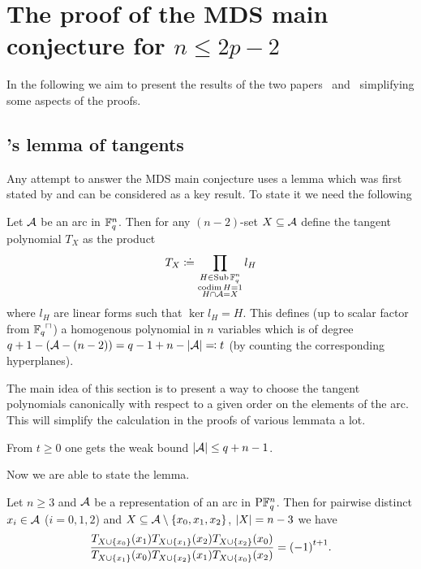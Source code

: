 \section{The proof of the MDS main conjecture for $n\leq 2p-2$}\label{sec-msd-nleq2p-2}

In the following we aim to present the results of the two papers~\cite{ball2011mdsmainconjI} and~\cite{ball2012mdsmainconjII} simplifying some aspects of the proofs.

\subsection{'s lemma of tangents}%

Any attempt to answer the MDS main conjecture uses a lemma which was first stated by  and can be considered as a key result. To state it we need the following

\begin{definition}
    Let $\mathcal{A}$ be an arc in $\mathbb{F}_{q}^n$. Then for any $(n-2)$-set $X\subseteq \mathcal{A}$ define the tangent polynomial $T_X$ as the product
    $$
    T_X\mathrel{\mathrel{\mathop:}\mkern-1.2mu\doteq}\prod_{\substack{H\in\mathop{\mathrm{Sub}}\nolimits \mathbb{F}_{q}^n\\ \mathop\mathrm{codim}{H}=1\\ H\cap\mathcal{A}=X}}{l_H}
    $$
    where $l_H$ are linear forms such that $\ker{l_H}=H$. This defines (up to scalar factor from $\units{\field{q}}$) a homogenous polynomial in $n$ variables which is of degree $q+1-(\mathcal{A}-(n-2))=q-1+n-\left\vert{\mathcal{A}}\right\vert\mathrel{=\mkern-1.2mu\mathrel{\mathop:}} t$ (by counting the corresponding hyperplanes).
\end{definition}

    The main idea of this section is to present a way to choose the tangent polynomials canonically with respect to a given order on the elements of the arc. This will simplify the calculation in the proofs of various lemmata a lot.

\begin{remark}
    From $t\geq 0$ one gets the weak bound $\left\vert{\mathcal{A}}\right\vert\leq q+n-1$.
\end{remark}

Now we are able to state the lemma.

\begin{lemma}\label{segre-tangent-lemma-orig}
  Let $n\geq3$ and $\mathcal{A}$ be a representation of an arc in $\P \field{q}^n$. Then for pairwise distinct $x_i\in \mathcal{A}$ ($i=0,1,2$) and $X\setleq \cA\setminus\set{x_0,x_1,x_2}$, $\left\vert{X}\right\vert=n-3$ we have
  $$    \frac{T_{X\setjoin\set{x_0}}(x_1)T_{X\setjoin\set{x_1}}(x_2)T_{X\setjoin\set{x_2}}(x_0)}{T_{X\setjoin\set{x_1}}(x_0)T_{X\setjoin\set{x_2}}(x_1)T_{X\setjoin\set{x_0}}(x_2)}={(-1)}^{t+1}.
  $$
\end{lemma}

